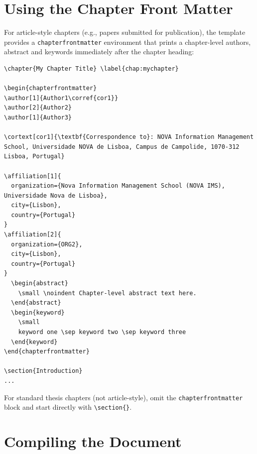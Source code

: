 \section{Using the Chapter Front Matter} \label{sec:chapterfrontmatter}


For article-style chapters (e.g., papers submitted for publication), the template
provides a \texttt{chapterfrontmatter} environment that prints a chapter-level authors, abstract and keywords immediately after the chapter heading:

\begin{verbatim}
\chapter{My Chapter Title} \label{chap:mychapter}

\begin{chapterfrontmatter}
\author[1]{Author1\corref{cor1}}
\author[2]{Author2}
\author[1]{Author3}

\cortext[cor1]{\textbf{Correspondence to}: NOVA Information Management School, Universidade NOVA de Lisboa, Campus de Campolide, 1070-312 Lisboa, Portugal}

\affiliation[1]{
  organization={Nova Information Management School (NOVA IMS), Universidade Nova de Lisboa},
  city={Lisbon},
  country={Portugal}
}
\affiliation[2]{
  organization={ORG2},
  city={Lisbon},
  country={Portugal}
}
  \begin{abstract}
    \small \noindent Chapter-level abstract text here.
  \end{abstract}
  \begin{keyword}
    \small
    keyword one \sep keyword two \sep keyword three
  \end{keyword}
\end{chapterfrontmatter}

\section{Introduction}
...
\end{verbatim}

For standard thesis chapters (not article-style), omit the
\texttt{chapterfrontmatter} block and start directly with
\texttt{\textbackslash section\{\}}.

\section{Compiling the Document} \label{sec:compile}

